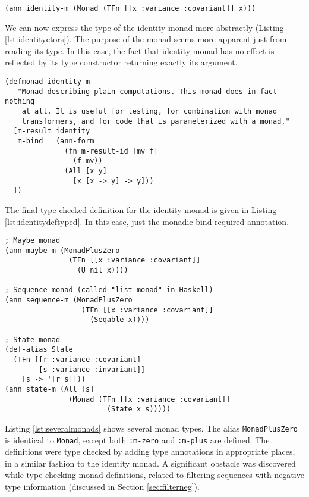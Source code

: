 \begin{lstlisting}[caption=Identity monad using user defined type constructors, label=lst:identityctors]
(ann identity-m (Monad (TFn [[x :variance :covariant]] x)))
\end{lstlisting}

We can now express the type of the identity monad more abstractly (Listing \ref{lst:identityctors}).
The purpose of the monad seems more apparent just from reading its type.
In this case, the fact that identity monad has no effect is reflected
by its type constructor returning exactly its argument.

\begin{lstlisting}[caption=Type checked identity monad definition, label=lst:identitydeftyped]
(defmonad identity-m
   "Monad describing plain computations. This monad does in fact nothing
    at all. It is useful for testing, for combination with monad
    transformers, and for code that is parameterized with a monad."
  [m-result identity
   m-bind   (ann-form
              (fn m-result-id [mv f]
                (f mv))
              (All [x y]
                [x [x -> y] -> y]))
  ])
\end{lstlisting}

The final type checked definition for the identity monad is given in Listing \ref{lst:identitydeftyped}.
In this case, just the monadic bind required annotation.

\begin{lstlisting}[caption=Several monad types, label=lst:severalmonads]
; Maybe monad
(ann maybe-m (MonadPlusZero
               (TFn [[x :variance :covariant]] 
                 (U nil x))))

; Sequence monad (called "list monad" in Haskell)
(ann sequence-m (MonadPlusZero 
                  (TFn [[x :variance :covariant]]
                    (Seqable x))))

; State monad
(def-alias State
  (TFn [[r :variance :covariant]
        [s :variance :invariant]]
    [s -> '[r s]]))
(ann state-m (All [s]
               (Monad (TFn [[x :variance :covariant]]
                        (State x s)))))
\end{lstlisting}

Listing \ref{lst:severalmonads} shows several monad types. The alias \lstinline|MonadPlusZero|
is identical to \lstinline|Monad|, except both \lstinline|:m-zero| and \lstinline|:m-plus| are defined.
The definitions were type checked by adding type annotations in appropriate places, in a similar fashion
to the identity monad. A significant obstacle was discovered while type checking monad definitions,
related to filtering sequences with negative type information (discussed in Section \ref{sec:filterneg}).

